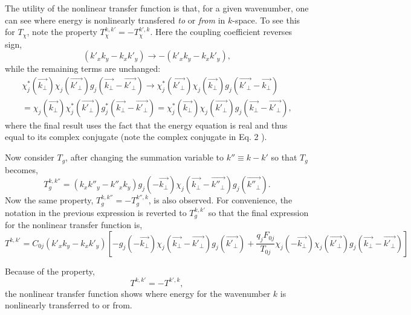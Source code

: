 \documentclass[11pt]{article}
\begin{document}
\begin{titlepage}
The utility of the nonlinear transfer function is that, for a given wavenumber, one can see where energy is nonlinearly transfered \emph{to} or \emph{from} in $k$-space.  To see this for $T_\chi$, note the property $T_\chi^{k,k'}=-T_\chi^{k',k}$.  Here the coupling coefficient reverses sign,   
\begin{equation}
(k'_xk_y-k_xk'_y)\rightarrow-(k'_xk_y-k_xk'_y),
\label{coupling1}
\end{equation}
while the remaining terms are unchanged:
\begin{eqnarray}
\nonumber &\chi^*_j(\vec{k_{\perp}}) \chi_j(\vec{k'_{\perp}})    g_j(\vec{k_{\perp}}-\vec{k'_{\perp}}) \rightarrow \chi^*_j(\vec{k'_{\perp}}) \chi_j(\vec{k_{\perp}}) g_j(\vec{k'_{\perp}}-\vec{k_{\perp}})&\\
&=\chi_j(\vec{k_{\perp}}) \chi^*_j(\vec{k'_{\perp}})    g^*_j(\vec{k_{\perp}}-\vec{k'_{\perp}})=\chi^*_j(\vec{k_{\perp}}) \chi_j(\vec{k'_{\perp}})    g_j(\vec{k_{\perp}}-\vec{k'_{\perp}}),
\label{}
\end{eqnarray}
where the final result uses the fact that the energy equation is real and thus equal to its complex conjugate (note the complex conjugate in Eq. 2 ).

Now consider $T_g$, after changing the summation variable to $k''\equiv k-k'  $ so that $T_g$ becomes,
\begin{equation}
T_g^{k,k''}=(k_xk''_y-k''_xk_y)   g_j(-\vec{k_{\perp}}) \chi_j(\vec{k_{\perp}}-\vec{k''_{\perp}})    g_j(\vec{k''_{\perp}}).
\label{}
\end{equation}
Now the same property, $T_g^{k,k''}=-T_g^{k'',k}$, is also observed.  For convenience, the notation in the previous expression is reverted to $T_g^{k,k'}$ so that the final expression for the nonlinear transfer function is,
\begin{equation}
T^{k,k'}=C_{0j}(k'_xk_y-k_xk'_y) \left[  -g_j(-\vec{k_{\perp}}) \chi_j(\vec{k_{\perp}}-\vec{k'_{\perp}})    g_j(\vec{k'_{\perp}})+\frac{q_jF_{0j}}{T_{0j}}   \chi_j(-\vec{k_{\perp}}) \chi_j(\vec{k'_{\perp}})    g_j(\vec{k_{\perp}}-\vec{k'_{\perp}}) \right ]
\label{}
\end{equation}


Because of the property,  
\begin{equation}
T^{k,k'}=-T^{k',k},
\label{}
\end{equation}
the nonlinear transfer function shows where energy for the wavenumber $k$ is nonlinearly transferred to or from.  



\end{titlepage}
\end{document}
